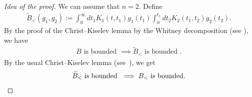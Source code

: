 \documentclass[AHL,Unicode,longabstracts,MathTools,published]{cedram}
\newcommand{\wt}{\widetilde}
\newcommand{\I}{\infty}
\begin{document}
\begin{proof}[Idea of the proof]
We can assume that $n=2$. Define
\begin{align}
\wt{B}_< (g_1,g_2) := \int_0^\I dt_1 K_1(t,t_1)g_1(t_1) \int_0^{t_1} dt_2 K_2(t_1,t_2)g_2(t_2).
\end{align}
By the proof of the Christ--Kiselev lemma by the Whitney decomposition (see \cite{2000T}), we have
\begin{align}
B \text{ is bounded } \implies \wt{B}_< \text{ is bounded }.
\end{align}
By the usual Christ--Kiselev lemma (see~\cite{2001CK}), we get
\begin{equation}
\wt{B}_< \text{ is bounded } \implies B_< \text{ is bounded}.\qedhere
\end{equation}
\end{proof}
\end{document}
